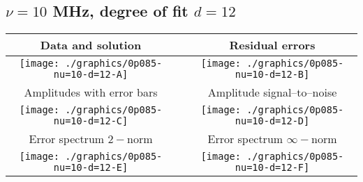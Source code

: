 

% 

\clearpage{}
\break{}

\subsection{$\nu = 10$ MHz, degree of fit $d = 12$}

\begin{table}[h]
    \begin{center}
        \begin{tabular}{ccc}
            Data and solution & \quad & Residual errors \\\hline
            \texttt{[image: ./graphics/0p085-nu=10-d=12-A]} &&
            \texttt{[image: ./graphics/0p085-nu=10-d=12-B]} \\[15pt]
            Amplitudes with error bars && Amplitude signal--to--noise \\\hline
            \texttt{[image: ./graphics/0p085-nu=10-d=12-C]} &&
            \texttt{[image: ./graphics/0p085-nu=10-d=12-D]} \\[15pt]
            Error spectrum $2-$norm && Error spectrum $\infty-$norm \\\hline
            \texttt{[image: ./graphics/0p085-nu=10-d=12-E]} &&
            \texttt{[image: ./graphics/0p085-nu=10-d=12-F]} \\[15pt]
        \end{tabular}
    \end{center}
\label{fig:elev=85, nu=10}
\end{table}



\endinput
